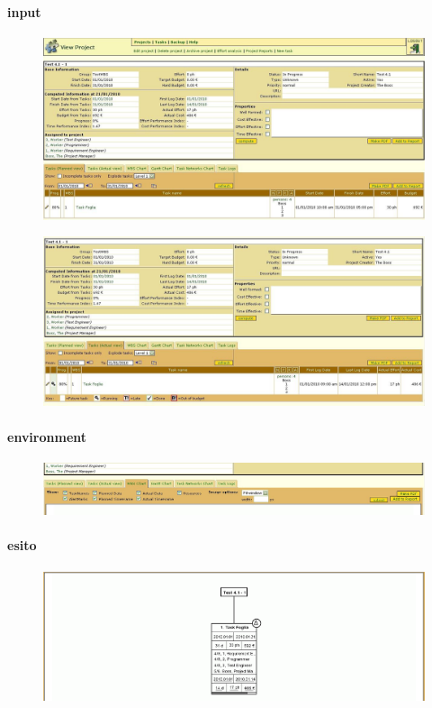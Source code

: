 \paragraph{input}
\begin{figure}[h!]
\centering
\includegraphics[width=\textwidth]{tests/TEST_WBS/4.1/4.1_1/Esempio_1/input.png}
\end{figure}
\begin{figure}[h!]
\centering
\includegraphics[width=\textwidth]{tests/TEST_WBS/4.1/4.1_1/Esempio_1/input_actual.png}
\end{figure}
\newpage
\paragraph{environment}
\begin{figure}
\centering
\includegraphics[width=\textwidth]{tests/TEST_WBS/4.1/4.1_1/Esempio_1/environment.png}
\end{figure}
\newpage
\paragraph{esito}
\begin{figure}
\centering
\includegraphics[width=\textwidth]{tests/TEST_WBS/4.1/4.1_1/Esempio_1/output.png}
\end{figure}
\newpage
